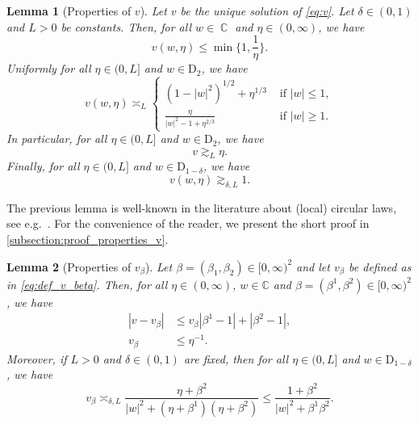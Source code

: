 \documentclass[10pt,a4paper]{amsart}
\DeclareMathOperator{\CC}{\mathbb{C}}
\newcommand{\abs}[1]{\left| #1 \right|}
\newcommand{\C}{\mathbb{C}}
\newtheorem{lemma}{Lemma}[section]
\numberwithin{equation}{section}
\begin{document}
	
	\begin{lemma}[Properties of $v$]\label{lem:profv}
		Let $v$ be the unique solution of \cref{eq:v}. Let $\delta \in (0,1)$ and $L>0$ be constants.
		Then, for all $w\in \CC$ and $\eta \in (0 , \infty)$, we have
		\begin{equation}\label{eq:v_leq_1}
			v(w,\eta) \le \min \biggl\{1, \frac{1}{\eta}\biggr\}.  
		\end{equation}
		Uniformly for all $\eta \in (0,L]$ and $w \in \mathrm{D}_2$, we have 
		\begin{equation} \label{eq:v_full_scaling} 
			v(w,\eta) \asymp_L \begin{cases} (1 - \abs{w}^2)^{1/2} + \eta^{1/3} & \text{ if } \abs{w} \leq 1, \\ 
				\frac{\eta}{\abs{w}^2 - 1 + \eta^{2/3}} & \text{ if } \abs{w} \geq 1. \end{cases}
		\end{equation}
		In particular, for all $\eta \in (0, L]$ and $w \in \mathrm{D}_2$, we have
		\begin{equation}\label{eq:vgeeta}
			v \gtrsim_{L} \eta.
		\end{equation}
		Finally, for all $\eta \in (0,L]$ and $w \in \mathrm{D}_{1-\delta}$, we have 
		\begin{equation}\label{eq:v_asymp_1} 
			v(w,\eta) \gtrsim_{\delta,L} 1. 
		\end{equation}   
	\end{lemma} 
	
	
	The previous lemma is well-known in the literature about (local) circular laws,   see e.g.\ \cite{BYY2014,AEKinhomogeneous,HeDigraph}. 
	For the convenience of the reader, we present the short proof in \cref{subsection:proof_properties_v}. 


	
	
	
	\begin{lemma}[Properties of $v_\beta$] \label{lem:properties_v_beta} 
		Let $\beta = (\beta_1, \beta_2) \in [0,\infty)^2$ and let $v_\beta$ be defined as in \eqref{eq:def_v_beta}. 
		Then, for all $\eta \in (0, \infty)$, $w \in \C$ and $\beta=(\beta^1,\beta^2) \in [0,\infty)^2$, we have 
		\begin{align}\label{eq:lipschitz_v_beta}
			|v-v_{\beta}| & \leq v_\beta|\beta^{1} -1| + |\beta^{2} -1 |, \\ 
			v_\beta & \leq \eta^{-1}.  \label{eq:v_beta_leq_eta_inverse} 
		\end{align} 
		Moreover, if $L >0$ and $\delta \in (0,1)$ are fixed, then for all $\eta \in (0,L]$ and $w \in \mathrm{D}_{1-\delta}$, we have 
		\begin{equation}\label{eq:encadrementmi}
			v_\beta \asymp_{\delta,L} \frac{\eta + \beta^{2}}{\abs{w}^2 + (\eta + \beta^1)(\eta + \beta^{2})} \leq \frac{1 + \beta^{2}}{\abs{w}^2 + \beta^{1} \beta^{2}}  .  
		\end{equation}
		
	\end{lemma}
	
\end{document}
